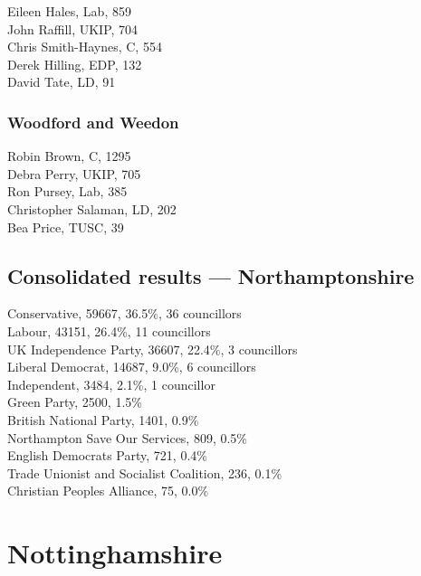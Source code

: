 \documentclass[a4paper,openany,10pt]{book}
\begin{document}


Eileen Hales, Lab, 859\\
John Raffill, UKIP, 704\\
Chris Smith-Haynes, C, 554\\
Derek Hilling, EDP, 132\\
David Tate, LD, 91\\


\subsubsection*{Woodford and Weedon}



Robin Brown, C, 1295\\
Debra Perry, UKIP, 705\\
Ron Pursey, Lab, 385\\
Christopher Salaman, LD, 202\\
Bea Price, TUSC, 39\\




\subsection*{Consolidated results --- Northamptonshire}
Conservative, 59667, 36.5\%, 36 councillors\\
Labour, 43151, 26.4\%, 11 councillors\\
UK Independence Party, 36607, 22.4\%, 3 councillors\\
Liberal Democrat, 14687, 9.0\%, 6 councillors\\
Independent, 3484, 2.1\%, 1 councillor\\
Green Party, 2500, 1.5\% \\
British National Party, 1401, 0.9\% \\
Northampton Save Our Services, 809, 0.5\% \\
English Democrats Party, 721, 0.4\% \\
Trade Unionist and Socialist Coalition, 236, 0.1\% \\
Christian Peoples Alliance, 75, 0.0\% \\


\vfill\eject

\section{Nottinghamshire}
\end{document}
